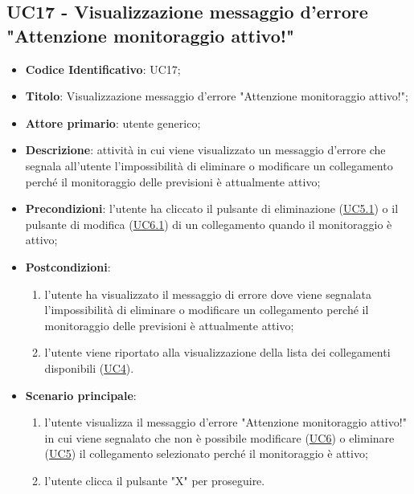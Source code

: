 	\subsection{UC17 - Visualizzazione messaggio d'errore "Attenzione monitoraggio attivo!"}
		\begin{itemize}
			\item\textbf{Codice Identificativo}: UC17;
			\item\textbf{Titolo}: Visualizzazione messaggio d'errore "Attenzione monitoraggio attivo!";
			\item\textbf{Attore primario}: utente generico;
			\item\textbf{Descrizione}: attività in cui viene visualizzato un messaggio d'errore che segnala all'utente l'impossibilità di eliminare o modificare un collegamento perché il monitoraggio delle previsioni è attualmente attivo;
			\item\textbf{Precondizioni}: l'utente ha cliccato il pulsante di eliminazione (\hyperref[par:UC5.1]{UC5.1}) o il pulsante di modifica (\hyperref[par:UC6.1]{UC6.1}) di un collegamento quando il monitoraggio è attivo;
			\item\textbf{Postcondizioni}: 
				\begin{enumerate}
					\item l'utente ha visualizzato il messaggio di errore dove viene segnalata l'impossibilità di eliminare o modificare un collegamento perché il monitoraggio delle previsioni è attualmente attivo;
					\item l'utente viene riportato alla visualizzazione della lista dei collegamenti disponibili (\hyperref[par:UC4]{UC4}).
				\end{enumerate}		
			\item\textbf{Scenario principale}:
				\begin{enumerate}
					\item l'utente visualizza il messaggio d'errore "Attenzione monitoraggio attivo!" in cui viene segnalato che non è possibile modificare (\hyperref[par:UC6]{UC6}) o eliminare (\hyperref[par:UC5]{UC5}) il collegamento selezionato perché il monitoraggio è attivo;
					\item l'utente clicca il pulsante "X" per proseguire.		
				\end{enumerate}		
		\end{itemize}


		\label{par:UC18}
